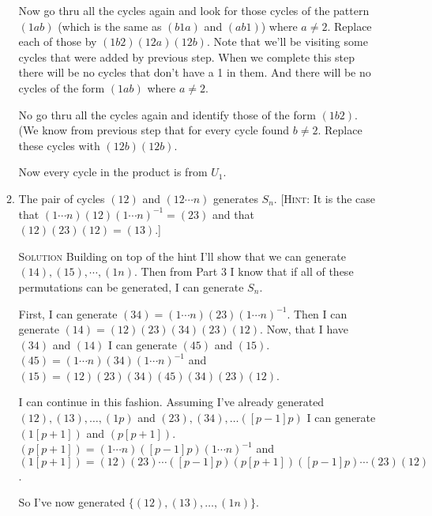\documentclass[twoside]{amsart}
\newcommand{\solution}{\textsc{Solution}\xspace}
\begin{document}
\begin{enumerate}[A.]
\begin{enumerate}[1]
	Now go thru all the cycles again and look for those cycles
	of the pattern $(1ab)$ (which is the same as $(b1a)$ and $(ab1)$)
	where $a \ne 2$.
	Replace each of those by $(1b2)(12a)(12b)$. Note that we'll
	be visiting some cycles that were added by previous step.
	When we complete this step there will be no cycles that don't have
	a 1 in them. And there will be no cycles of the form $(1ab)$ where
	$a \ne 2$.

	No go thru all the cycles again and identify those of the form
	$(1b2)$. (We know from previous step that for every cycle
	found $b \ne 2$. Replace these cycles with $(12b)(12b)$.

	Now every cycle in the product is from $U_1$.

	\item The pair of cycles $(12)$ and $(12\cdots n)$
	generates $S_n$. [\textsc{Hint}: It is the case that $(1\cdots
	n)(12)(1\cdots n)^{-1} = (23)$ and that $(12)(23)(12)=(13)$.]

	\noindent \solution Building on top of the hint I'll show that
	we can generate $(14), (15), \cdots, (1n)$. Then from Part 3
	I know that if all of these permutations can be generated, I
	can generate $S_n$.

	First, I can generate $(34) = (1\cdots n)(23)(1\cdots n)^{-1}$.
	Then I can generate $(14) = (12)(23)(34)(23)(12)$. Now, that 
	I have $(34)$ and $(14)$ I can generate $(45)$ and $(15)$.
	$(45) = (1\cdots n)(34)(1\cdots n)^{-1}$ and \\
	$(15) = (12)(23)(34)(45)(34)(23)(12)$.

	I can continue in this fashion. Assuming I've already generated
	$(12), (13), \ldots, (1p)$ and $(23), (34), \ldots ([p-1]p)$ I
	can generate $(1[p+1])$ and $(p[p+1])$.
	$(p[p+1]) = (1\cdots n)([p-1]p)(1\cdots n)^{-1}$ and
	$(1[p+1]) = (12)(23)\cdots ([p-1]p)(p[p+1])([p-1]p) \cdots (23)(12)$.

	So I've now generated $\{(12),(13),\ldots,(1n)\}$.


   \end{enumerate}


   
 
\end{enumerate}
\end{document}
